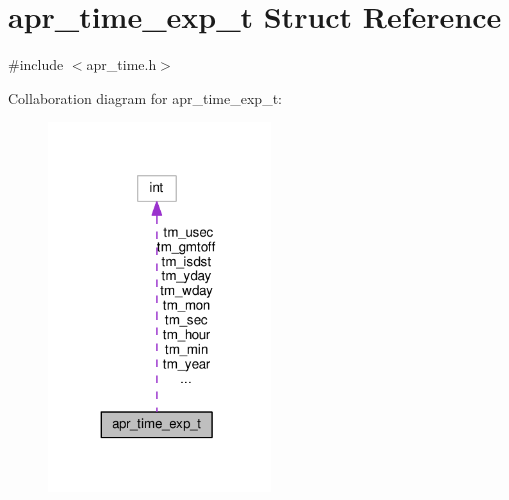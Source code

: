 \hypertarget{structapr__time__exp__t}{}\section{apr\+\_\+time\+\_\+exp\+\_\+t Struct Reference}
\label{structapr__time__exp__t}


{\ttfamily \#include $<$apr\+\_\+time.\+h$>$}



Collaboration diagram for apr\+\_\+time\+\_\+exp\+\_\+t\+:
\nopagebreak
\begin{figure}[H]
\begin{center}
\leavevmode
\includegraphics[width=167pt]{structapr__time__exp__t__coll__graph}
\end{center}
\end{figure}
